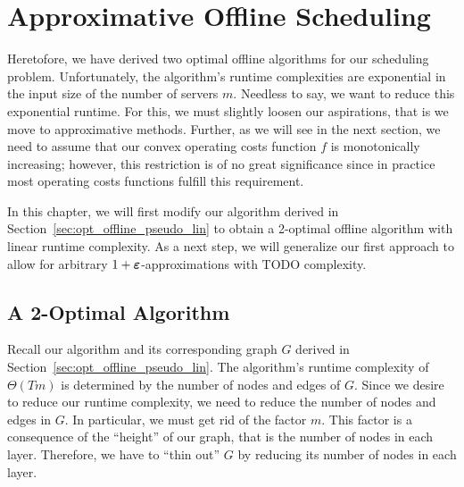 
\chapter{Approximative Offline Scheduling}
Heretofore, we have derived two optimal offline algorithms for our scheduling problem. Unfortunately, the algorithm's runtime complexities are exponential in the input size of the number of servers $m$. Needless to say, we want to reduce this exponential runtime. For this, we must slightly loosen our aspirations, that is we move to approximative methods. Further, as we will see in the next section, we need to assume that our convex operating costs function $f$ is monotonically increasing; however, this restriction is of no great significance since in practice most operating costs functions fulfill this requirement. 

In this chapter, we will first modify our algorithm derived in Section~\ref{sec:opt_offline_pseudo_lin} to obtain a 2-optimal offline algorithm with linear runtime complexity. As a next step, we will generalize our first approach to allow for arbitrary $1+\boldsymbol\varepsilon$-approximations with TODO complexity.

\section{A 2-Optimal Algorithm}
Recall our algorithm and its corresponding graph $G$ derived in Section~\ref{sec:opt_offline_pseudo_lin}. The algorithm's runtime complexity of $\Theta(Tm)$ is determined by the number of nodes and edges of $G$. Since we desire to reduce our runtime complexity, we need to reduce the number of nodes and edges in $G$. In particular, we must get rid of the factor $m$. This factor is a consequence of the ``height'' of our graph, that is the number of nodes in each layer. Therefore, we have to ``thin out'' $G$ by reducing its number of nodes in each layer.

